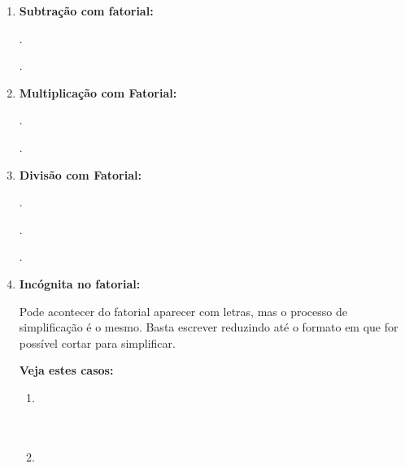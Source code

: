 \begin{multicols*}{2}
\begin{enumerate}
	.
	
	\item \textbf{Subtração com fatorial:}
	
	.
	
	.
	
	
	\item \textbf{Multiplicação com Fatorial:}
	
	.
	
	.
	
	\item \textbf{Divisão com Fatorial:}
	
	.
	
	.
	
	.

	\item \textbf{Incógnita no fatorial:}
	
Pode acontecer do fatorial aparecer com letras, mas o processo de simplificação é o mesmo. Basta escrever reduzindo até o formato em que for possível cortar para simplificar.

\textbf{Veja estes casos:}

		\begin{enumerate}

		\item 	{}\\

					\\

					\\
					
		\item 	{}\\
		
					\\
					

\end{enumerate}
\end{enumerate}
\end{multicols*}
